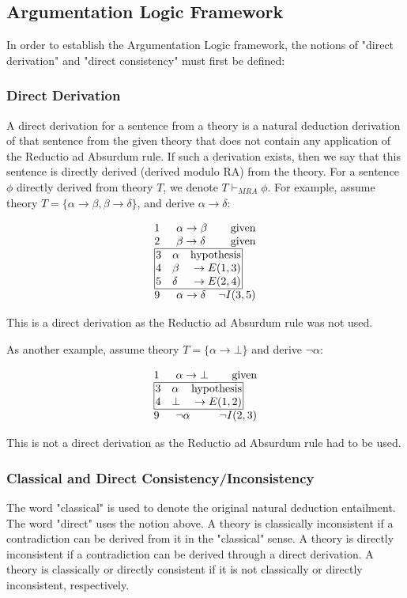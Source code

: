 \documentclass[11pt,twoside,a4paper]{report}
\begin{document}
\subsection{Argumentation Logic Framework}
In order to establish the Argumentation Logic framework, the notions of "direct derivation" and "direct consistency" must first be defined:

\subsubsection{Direct Derivation}
A direct derivation for a sentence from a theory is a natural deduction derivation of that sentence from the given theory that does not contain any application of the Reductio ad Absurdum rule. If such a derivation exists, then we say that this sentence is directly derived (derived modulo RA) from the theory. For a sentence $\phi$ directly derived from theory $T$, we denote $T\vdash_{MRA} \phi$.
For example, assume theory $T = \{\alpha\rightarrow\beta, \beta\rightarrow\delta\}$, and derive $\alpha\rightarrow\delta$:

\[\vbox{\offinterlineskip\halign{
&\tabskip=1.5em#\strut&$#$\hfil\tabskip=1em&\hfil$#$\tabskip=0em\cr
%
1&\alpha\rightarrow\beta&\mbox{given}\cr
2&\beta\rightarrow\delta&\mbox{given}\cr
%
\multispan3\vbox{\halign{
\vrule#&&\hskip.1em\tabskip=1em#\strut&$#$\hfil\tabskip=1em&\hfil$#$\hskip0.1em\tabskip=0em&\vrule#\cr
\noalign{\hrule}
%
&3&\alpha&\mbox{hypothesis}&\cr
&4&\beta&\rightarrow E(1,3)&\cr
&5&\delta&\rightarrow E(2,4)&\cr
%
\noalign{\hrule}}}\,\cr
%
9&\alpha\rightarrow\delta&\neg I(3,5)\cr
}}\]

This is a direct derivation as the Reductio ad Absurdum rule was not used.

As another example, assume theory $T = \{\alpha\rightarrow\bot\}$ and derive $\neg\alpha$:

\[\vbox{\offinterlineskip\halign{
&\tabskip=1.5em#\strut&$#$\hfil\tabskip=1em&\hfil$#$\tabskip=0em\cr
%
1&\alpha\rightarrow\bot&\mbox{given}\cr
%
\multispan3\vbox{\halign{
\vrule#&&\hskip.1em\tabskip=1em#\strut&$#$\hfil\tabskip=1em&\hfil$#$\hskip0.1em\tabskip=0em&\vrule#\cr
\noalign{\hrule}
%
&3&\alpha&\mbox{hypothesis}&\cr
&4&\bot&\rightarrow E(1,2)&\cr
%
\noalign{\hrule}}}\,\cr
%
9&\neg\alpha&\neg I(2,3)\cr
}}\]

This is not a direct derivation as the Reductio ad Absurdum rule had to be used.

\subsubsection{Classical and Direct Consistency/Inconsistency}
The word "classical" is used to denote the original natural deduction entailment. The word "direct" uses the notion above. A theory is classically inconsistent if a contradiction can be derived from it in the "classical" sense. A theory is directly inconsistent if a contradiction can be derived through a direct derivation. A theory is classically or directly consistent if it is not classically or directly inconsistent, respectively.
\end{document}
